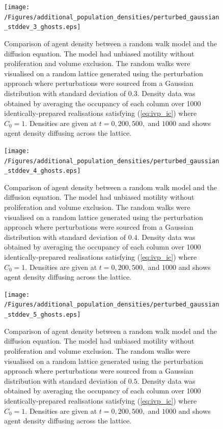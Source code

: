 \documentclass[11pt,titlepage,a4paper]{article}
\begin{document}
\begin{appendix}
		\clearpage
		\begin{figure}[tbh]
			\centering
				\texttt{[image: /Figures/additional\_population\_densities/perturbed\_gaussian\_stddev\_3\_ghosts.eps]}
			\caption{Comparison of agent density between a random walk model and the diffusion equation. The model had unbiased motility without proliferation and volume exclusion. The random walks were visualised on a random lattice generated using the perturbation approach where perturbations were sourced from a Gaussian distribution with standard deviation of $0.3$. Density data was obtained by averaging the occupancy of each column over 1000 identically-prepared realisations satisfying (\ref{eq:ivp_ic}) where $C_0 = 1$. Densities are given at $t = 0, 200, 500,$ and $1000$ and shows agent density diffusing across the lattice.}
			\label{fig:perturbed_gaussian_stddev_3_ghosts}
		\end{figure}

		\clearpage
		\begin{figure}[tbh]
			\centering
				\texttt{[image: /Figures/additional\_population\_densities/perturbed\_gaussian\_stddev\_4\_ghosts.eps]}
			\caption{Comparison of agent density between a random walk model and the diffusion equation. The model had unbiased motility without proliferation and volume exclusion. The random walks were visualised on a random lattice generated using the perturbation approach where perturbations were sourced from a Gaussian distribution with standard deviation of $0.4$. Density data was obtained by averaging the occupancy of each column over 1000 identically-prepared realisations satisfying (\ref{eq:ivp_ic}) where $C_0 = 1$. Densities are given at $t = 0, 200, 500,$ and $1000$ and shows agent density diffusing across the lattice.}
			\label{fig:perturbed_gaussian_stddev_4_ghosts}
		\end{figure}

		\clearpage
		\begin{figure}[tbh]
			\centering
				\texttt{[image: /Figures/additional\_population\_densities/perturbed\_gaussian\_stddev\_5\_ghosts.eps]}
			\caption{Comparison of agent density between a random walk model and the diffusion equation. The model had unbiased motility without proliferation and volume exclusion. The random walks were visualised on a random lattice generated using the perturbation approach where perturbations were sourced from a Gaussian distribution with standard deviation of $0.5$. Density data was obtained by averaging the occupancy of each column over 1000 identically-prepared realisations satisfying (\ref{eq:ivp_ic}) where $C_0 = 1$. Densities are given at $t = 0, 200, 500,$ and $1000$ and shows agent density diffusing across the lattice.}
			\label{fig:perturbed_gaussian_stddev_5_ghosts}
		\end{figure}

\end{appendix}
\end{document}
